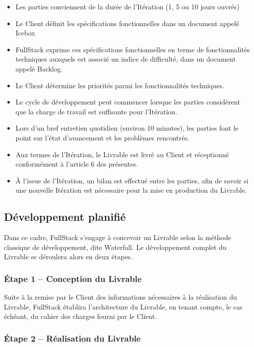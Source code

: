\documentclass[11pt]{article}
\begin{document}
\begin{itemize}
  \item Les parties conviennent de la durée de l’Itération (1, 5 ou 10 jours ouvrés)
  \item Le Client définit les spécifications fonctionnelles dans un document appelé Icebox
  \item FullStack exprime ces spécifications fonctionnelles en terme de fonctionnalités techniques auxquels est associé un indice de difficulté, dans un document appelé Backlog.
  \item Le Client détermine les priorités parmi les fonctionnalités techniques.
  \item Le cycle de développement peut commencer lorsque les parties considèrent que la charge de travail est suffisante pour l’Itération.
  \item Lors d’un bref entretien quotidien (environ 10 minutes), les parties font le point sur l’état d’avancement et les problèmes rencontrés.
  \item Aux termes de l’Itération, le Livrable est livré au Client et réceptionné conformément à l’article 6 des présentes.
  \item À l’issue de l’Itération, un bilan est effectué entre les parties, afin de savoir si une nouvelle Itération est nécessaire pour la mise en production du Livrable.
\end{itemize}


\subsection{Développement planifié}

Dans ce cadre, FullStack s’engage à concevoir un Livrable selon la méthode classique de développement, dite Waterfall. Le développement complet du Livrable se déroulera alors en deux étapes.

\subsubsection{Étape 1 – Conception du Livrable}

Suite à la remise par le Client des informations nécessaires à la réalisation du Livrable, FullStack établira l’architecture du Livrable, en tenant compte, le cas échéant, du cahier des charges fourni par le Client.

\subsubsection{Étape 2 – Réalisation du Livrable}
\end{document}
